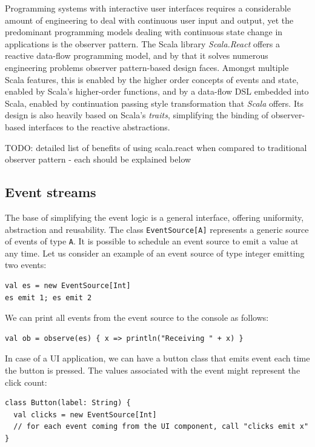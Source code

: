 Programming systems with interactive user interfaces requires a considerable amount of engineering to deal with continuous user input and output, yet the predominant programming models dealing with continuous state change in applications is the observer pattern. The Scala library \emph{Scala.React} offers a reactive data-flow programming model, and by that it solves numerous engineering problems observer pattern-based design faces. Amongst multiple Scala features, this is enabled by the higher order concepts of events and state, enabled by Scala's higher-order functions, and by a data-flow DSL embedded into Scala, enabled by continuation passing style transformation that \emph{Scala} offers. Its design is also heavily based on Scala's \emph{traits}, simplifying the binding of observer-based interfaces to the reactive abstractions.\cite{DeprecatingObservers}

TODO: detailed list of benefits of using scala.react when compared to traditional observer pattern - each should be explained below

\subsection{Event streams}

The base of simplifying the event logic is a general interface, offering uniformity, abstraction and reusability. The class {\tt EventSource[A]} represents a generic source of events of type {\tt A}. It is possible to schedule an event source to emit a value at any time. Let us consider an example of an event source of type integer emitting two events:
\begin{lstlisting}
val es = new EventSource[Int]
es emit 1; es emit 2
\end{lstlisting}

We can print all events from the event source to the console as follows:
\begin{lstlisting}
val ob = observe(es) { x => println("Receiving " + x) }
\end{lstlisting}

In case of a UI application, we can have a button class that emits event each time the button is pressed. The values associated with the event might represent the click count:

\begin{lstlisting}
class Button(label: String) {
  val clicks = new EventSource[Int]
  // for each event coming from the UI component, call "clicks emit x"
}
\end{lstlisting}

